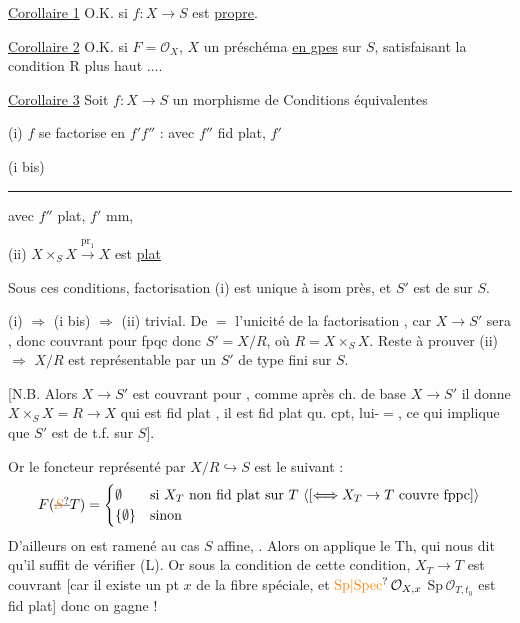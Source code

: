 
\uline{Corollaire 1} O.K. si $f:X\to S$ est \uline{propre}.

\uline{Corollaire 2} O.K. si  $F=\mathcal O_X$, $X$ un préschéma \uline{en gpes} sur $S$, satisfaisant la condition R plus haut ....

\uline{Corollaire 3} Soit $f:X\to S$ un morphisme de  Conditions équivalentes

(i) $f$ se factorise en $f'f''$ :  avec $f''$ fid plat, $f'$ 

(i bis) \rule{4cm}{0.3pt} avec $f''$ plat, $f'$ mm,

(ii)   $X\times_S X\xrightarrow{\mathrm{pr}_1}X$ est \uline{plat}

Sous ces conditions,  factorisation (i) est unique à isom près, et $S'$ est de  sur $S$.

(i) $\Rightarrow$ (i bis) $\Rightarrow$ (ii) trivial. De $=$ l'unicité de la factorisation , car $X\to S'$ sera , donc couvrant pour fpqc donc $S'=X/R$, où $R=X\times_S X$.
Reste à prouver (ii) $\Rightarrow$  $X/R$ est représentable par un $S'$ de  type fini sur $S$. 

[N.B. Alors $X\to S'$ est couvrant pour , comme après ch.  de base $X\to S'$ il donne $X\times_S X=R\longrightarrow X$ qui est fid plat , il est fid plat qu. cpt, lui-$=$, ce qui implique  que $S'$ est  de t.f.  sur $S$].

Or  le foncteur représenté par $X/R\hookrightarrow S$ est  le suivant :
\[
F(\deleted{\unsure{S}}T)=\begin{cases}
\emptyset&\text{si } X_T\ \text{non fid plat sur }T\ \inserted{[\Longleftrightarrow X_T\to T\ \text{couvre fppc}]}\\
\{\emptyset\}&\text{sinon}
\end{cases}
\]
D'ailleurs on est ramené au cas $S$ affine, .  Alors on applique le Th, qui nous dit qu'il suffit de vérifier  (L). Or sous la condition de cette condition, $X_T\to T$ est couvrant [car il existe un pt $x$ de la fibre spéciale, et $\unsure{\mathrm{Sp}|\mathrm{Spec}}\,\mathcal O_{X,x}$ \unsure{--|$\to$} $\mathrm{Sp}\,\mathcal O_{T,t_0}$ est fid plat] donc on gagne !

